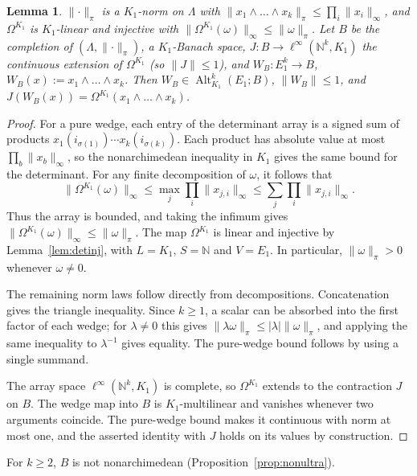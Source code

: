 \documentclass[11pt]{amsart}
\newtheorem{lemma}[theorem]{Lemma}
\theoremstyle{definition}
\theoremstyle{remark}
\numberwithin{equation}{section}
\newcommand{\N}{\mathbb N}
\newcommand{\Alt}{\operatorname{Alt}}
\newcommand{\linf}{\ell^\infty}
\newcommand{\abs}[1]{\lvert #1\rvert}
\newcommand{\norm}[1]{\lVert #1\rVert}
\begin{document}
\begin{lemma}\label{lem:proj}
$\norm\cdot_\pi$ is a $K_1$\nobreakdash-norm on $\Lambda$ with $\norm{x_1\wedge\dots\wedge x_k}_\pi\le\prod_i\norm{x_i}_\infty$, and
$\Omega^{K_1}$ is $K_1$\nobreakdash-linear and injective with $\norm{\Omega^{K_1}(\omega)}_\infty\le\norm\omega_\pi$. Let $B$ be the completion of
$(\Lambda,\norm\cdot_\pi)$, a $K_1$\nobreakdash-Banach space, $J\colon B\to\linf(\N^k,K_1)$ the continuous extension of $\Omega^{K_1}$ (so
$\norm J\le1$), and $W_B\colon E_1^k\to B$, $W_B(x):=x_1\wedge\dots\wedge x_k$. Then $W_B\in\Alt^k_{K_1}(E_1;B)$,
$\norm{W_B}\le1$, and $J(W_B(x))=\Omega^{K_1}(x_1\wedge\dots\wedge x_k)$.
\end{lemma}

\begin{proof}
For a pure wedge, each entry of the determinant array is a signed sum of products
$x_1(i_{\sigma(1)})\cdots x_k(i_{\sigma(k)})$. Each product has absolute value at most
$\prod_b\norm{x_b}_\infty$, so the nonarchimedean inequality in $K_1$ gives the same bound for the determinant.
For any finite decomposition of $\omega$, it follows that
\[
\norm{\Omega^{K_1}(\omega)}_\infty
\le\max_j\prod_i\norm{x_{j,i}}_\infty
\le\sum_j\prod_i\norm{x_{j,i}}_\infty.
\]
Thus the array is bounded, and taking the infimum gives
$\norm{\Omega^{K_1}(\omega)}_\infty\le\norm\omega_\pi$.
The map $\Omega^{K_1}$ is linear and injective by Lemma~\ref{lem:detinj}, with $L=K_1$, $S=\N$ and $V=E_1$.
In particular, $\norm\omega_\pi>0$ whenever $\omega\ne0$.

The remaining norm laws follow directly from decompositions. Concatenation gives the triangle inequality.
Since $k\ge1$, a scalar can be absorbed into the first factor of each wedge; for $\lambda\ne0$ this gives
$\norm{\lambda\omega}_\pi\le\abs\lambda\norm\omega_\pi$, and applying the same inequality to $\lambda^{-1}$ gives
equality. The pure-wedge bound follows by using a single summand.

The array space $\linf(\N^k,K_1)$ is complete, so $\Omega^{K_1}$ extends to the contraction $J$ on $B$.
The wedge map into $B$ is $K_1$\nobreakdash-multilinear and vanishes whenever two arguments coincide. The pure-wedge
bound makes it continuous with norm at most one, and the asserted identity with $J$ holds on its values by
construction.
\end{proof}

For $k\ge2$, $B$ is not nonarchimedean (Proposition~\ref{prop:nonultra}).
\end{document}

